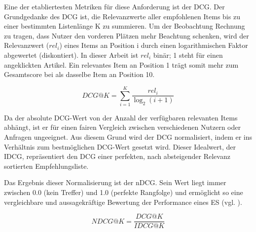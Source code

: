 Eine der etabliertesten Metriken für diese Anforderung ist der \ac{DCG}. 
Der Grundgedanke des \ac{DCG} ist, 
die Relevanzwerte aller empfohlenen Items bis zu einer bestimmten Listenlänge 
K zu summieren. Um der Beobachtung Rechnung zu tragen, dass Nutzer den vorderen 
Plätzen mehr Beachtung schenken, wird der Relevanzwert (\(rel_{i}\)) eines Items an 
Position i durch einen logarithmischen Faktor abgewertet (diskontiert).
In dieser Arbeit ist \(rel_{i}\) binär; 1 steht für einen angeklickten Artikel.
Ein relevantes Item an Position 1 trägt somit mehr zum Gesamtscore bei als
dasselbe Item an Position 10.

\begin{equation}
\label{eq:dcg}
DCG@K=\sum_{i=1}^{K}\frac{rel_{i}}{\log_2(i+1)}
\end{equation}

Da der absolute \ac{DCG}-Wert von der Anzahl der verfügbaren relevanten 
Items abhängt, ist er für einen fairen Vergleich zwischen verschiedenen Nutzern 
oder Anfragen ungeeignet. Aus diesem Grund wird der \ac{DCG} normalisiert, 
indem er ins Verhältnis zum bestmöglichen \ac{DCG}-Wert gesetzt wird. Dieser 
Idealwert, der \ac{IDCG}, repräsentiert den \ac{DCG} einer perfekten,
 nach absteigender Relevanz sortierten Empfehlungsliste.

Das Ergebnis dieser Normalisierung ist der \ac{nDCG}. Sein Wert liegt immer zwischen 0.0 
(kein Treffer) und 1.0 (perfekte Rangfolge) und ermöglicht so eine 
vergleichbare und aussagekräftige Bewertung der Performance eines \ac{ES} 
(vgl. \cite{Jarvelin_ndcg_2002}).

\begin{equation}
\label{eq:ndcg}
NDCG@K=\frac{DCG@K}{IDCG@K}
\end{equation}


